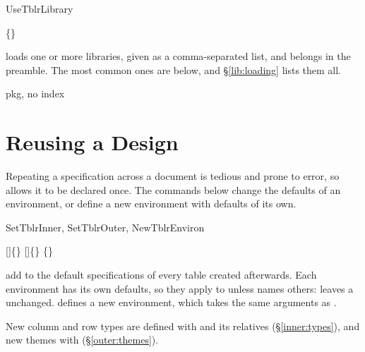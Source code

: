 \begin{codedescribe}[code]{UseTblrLibrary}
  \begin{codesyntax}
    \{\}
  \end{codesyntax}
   loads one or more libraries, given as a comma-separated list, and belongs in the preamble. The most common ones are below, and \S\ref{lib:loading} lists them all.
  \begin{describelist*}[24mm]{pkg, no index}
  \end{describelist*}
\end{codedescribe}

\section{Reusing a Design}\label{impatient:reuse}
Repeating a specification across a document is tedious and prone to error, so  allows it to be declared once. The commands below change the defaults of an environment, or define a new environment with defaults of its own.

\begin{codedescribe}[code]{SetTblrInner, SetTblrOuter, NewTblrEnviron}
  \begin{codesyntax}
    []\{\}
    []\{\}
    \{\}
  \end{codesyntax}
   add to the default specifications of every table created afterwards. Each environment has its own defaults, so they apply to  unless  names others:  leaves a  unchanged.  defines a new environment, which takes the same arguments as .
  \begin{tsremark}
    New column and row types are defined with  and its relatives (\S\ref{inner:types}), and new themes with  (\S\ref{outer:themes}).
  \end{tsremark}
\end{codedescribe}

